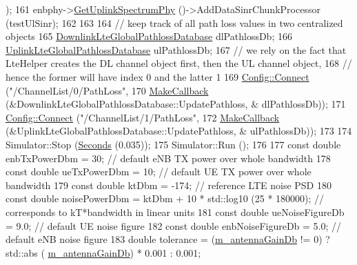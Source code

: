 \begin{DoxyCode}
      );
161   enbphy->\hyperlink{classns3_1_1LtePhy_aa17612c41d80653ed556431eedef4304}{GetUplinkSpectrumPhy} ()->AddDataSinrChunkProcessor (testUlSinr);
162 
163 
164   \textcolor{comment}{// keep track of all path loss values in two centralized objects}
165   \hyperlink{classns3_1_1DownlinkLteGlobalPathlossDatabase}{DownlinkLteGlobalPathlossDatabase} dlPathlossDb;
166   \hyperlink{classns3_1_1UplinkLteGlobalPathlossDatabase}{UplinkLteGlobalPathlossDatabase} ulPathlossDb;
167   \textcolor{comment}{// we rely on the fact that LteHelper creates the DL channel object first, then the UL channel object,}
168   \textcolor{comment}{// hence the former will have index 0 and the latter 1}
169   \hyperlink{group__config_ga4014f151241cd0939b6cb64409605736}{Config::Connect} (\textcolor{stringliteral}{"/ChannelList/0/PathLoss"},
170                    \hyperlink{group__makecallbackmemptr_ga9376283685aa99d204048d6a4b7610a4}{MakeCallback} (&DownlinkLteGlobalPathlossDatabase::UpdatePathloss, &
      dlPathlossDb));
171   \hyperlink{group__config_ga4014f151241cd0939b6cb64409605736}{Config::Connect} (\textcolor{stringliteral}{"/ChannelList/1/PathLoss"},
172                     \hyperlink{group__makecallbackmemptr_ga9376283685aa99d204048d6a4b7610a4}{MakeCallback} (&UplinkLteGlobalPathlossDatabase::UpdatePathloss, &
      ulPathlossDb)); 
173 
174   Simulator::Stop (\hyperlink{group__timecivil_ga33c34b816f8ff6628e33d5c8e9713b9e}{Seconds} (0.035));
175   Simulator::Run ();
176 
177   \textcolor{keyword}{const} \textcolor{keywordtype}{double} enbTxPowerDbm = 30; \textcolor{comment}{// default eNB TX power over whole bandwidth}
178   \textcolor{keyword}{const} \textcolor{keywordtype}{double} ueTxPowerDbm  = 10; \textcolor{comment}{// default UE TX power over whole bandwidth}
179   \textcolor{keyword}{const} \textcolor{keywordtype}{double} ktDbm = -174;    \textcolor{comment}{// reference LTE noise PSD}
180   \textcolor{keyword}{const} \textcolor{keywordtype}{double} noisePowerDbm = ktDbm + 10 * std::log10 (25 * 180000); \textcolor{comment}{// corresponds to kT*bandwidth in
       linear units}
181   \textcolor{keyword}{const} \textcolor{keywordtype}{double} ueNoiseFigureDb = 9.0; \textcolor{comment}{// default UE noise figure}
182   \textcolor{keyword}{const} \textcolor{keywordtype}{double} enbNoiseFigureDb = 5.0; \textcolor{comment}{// default eNB noise figure}
183   \textcolor{keywordtype}{double} tolerance = (\hyperlink{classLteEnbAntennaTestCase_a0fa6f3b1360dea56b4931cda06709952}{m\_antennaGainDb} != 0) ? std::abs (
      \hyperlink{classLteEnbAntennaTestCase_a0fa6f3b1360dea56b4931cda06709952}{m\_antennaGainDb}) * 0.001 : 0.001;

\end{DoxyCode}
